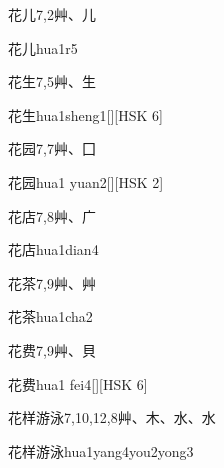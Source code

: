 \begin{Entry}{花儿}{7,2}{⾋、⼉}
  \begin{Phonetics}{花儿}{hua1r5}
  \end{Phonetics}
\end{Entry}

\begin{Entry}{花生}{7,5}{⾋、⽣}
  \begin{Phonetics}{花生}{hua1sheng1}[][HSK 6]
  \end{Phonetics}
\end{Entry}

\begin{Entry}{花园}{7,7}{⾋、⼞}
  \begin{Phonetics}{花园}{hua1 yuan2}[][HSK 2]
  \end{Phonetics}
\end{Entry}

\begin{Entry}{花店}{7,8}{⾋、⼴}
  \begin{Phonetics}{花店}{hua1dian4}
  \end{Phonetics}
\end{Entry}

\begin{Entry}{花茶}{7,9}{⾋、⾋}
  \begin{Phonetics}{花茶}{hua1cha2}
  \end{Phonetics}
\end{Entry}

\begin{Entry}{花费}{7,9}{⾋、⾙}
  \begin{Phonetics}{花费}{hua1 fei4}[][HSK 6]
  \end{Phonetics}
\end{Entry}

\begin{Entry}{花样游泳}{7,10,12,8}{⾋、⽊、⽔、⽔}
  \begin{Phonetics}{花样游泳}{hua1yang4you2yong3}
  \end{Phonetics}
\end{Entry}

